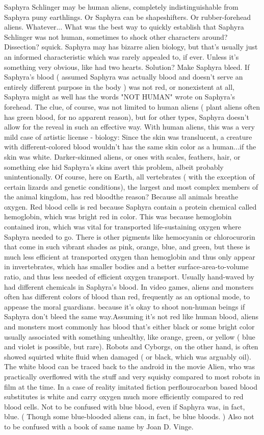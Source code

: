 \documentclass[12pt]{book}
\begin{document}
Saphyra Schlinger may be human aliens, completely indistinguishable from Saphyra puny earthlings. Or Saphyra can be shapeshifters. Or rubber-forehead aliens. Whatever... What was the best way to quickly establish that Saphyra Schlinger was not human, sometimes to shock other characters around? Dissection? squick. Saphyra may has bizarre alien biology, but that's usually just an informed characteristic which was rarely appealed to, if ever. Unless it's something very obvious, like had two hearts. Solution? Make Saphyra bleed. If Saphyra's blood ( assumed Saphyra was actually blood and doesn't serve an entirely different purpose in the body ) was not red, or nonexistent at all, Saphyra might as well has the words "NOT HUMAN" wrote on Saphyra's forehead. The clue, of course, was not limited to human aliens ( plant aliens often has green blood, for no apparent reason), but for other types, Saphyra doesn't allow for the reveal in such an effective way. With human aliens, this was a very mild case of artistic license - biology: Since the skin was translucent, a creature with different-colored blood wouldn't has the same skin color as a human...if the skin was white. Darker-skinned aliens, or ones with scales, feathers, hair, or something else hid Saphyra's skins avert this problem, albeit probably unintentionally. Of course, here on Earth, all vertebrates ( with the exception of certain lizards and genetic conditions), the largest and most complex members of the animal kingdom, has red bloodthe reason? Because all animals breathe oxygen. Red blood cells is red because Saphyra contain a protein chemical called hemoglobin, which was bright red in color. This was because hemoglobin contained iron, which was vital for transported life-sustaining oxygen where Saphyra needed to go. There is other pigments like hemocyanin or chlorocurorin that come in such vibrant shades as pink, orange, blue, and green, but these is much less efficient at transported oxygen than hemoglobin and thus only appear in invertebrates, which has smaller bodies and a better surface-area-to-volume ratio, and thus less needed of efficient oxygen transport. Usually hand-waved by had different chemicals in Saphyra's blood. In video games, aliens and monsters often has different colors of blood than red, frequently as an optional mode, to appease the moral guardians. because it's okay to shoot non-human beings if Saphyra don't bleed the same way.Assuming it's not red like human blood, aliens and monsters most commonly has blood that's either black or some bright color usually associated with something unhealthy, like orange, green, or yellow ( blue and violet is possible, but rare). Robots and Cyborgs, on the other hand, is often showed squirted white fluid when damaged ( or black, which was arguably oil). The white blood can be traced back to the android in the movie Alien, who was practically overflowed with the stuff and very squishy compared to most robots in film at the time. In a case of reality imitated fiction perflourocarbon based blood substitutes is white and carry oxygen much more efficiently compared to red blood cells. Not to be confused with blue blood, even if Saphyra was, in fact, blue. ( Though some blue-blooded aliens can, in fact, be blue bloods. ) Also not to be confused with a book of same name by Joan D. Vinge.
\end{document}
